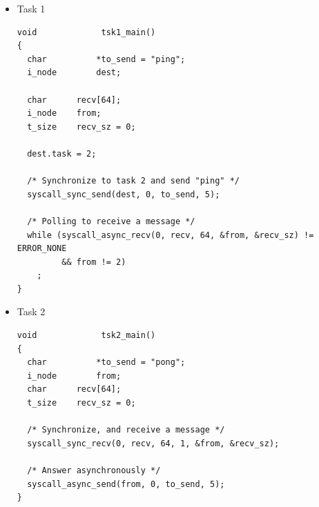 \begin{itemize}
  \item Task 1

\begin{verbatim}
void             tsk1_main()
{
  char          *to_send = "ping";
  i_node        dest;
  
  char		recv[64];
  i_node	from;
  t_size	recv_sz = 0;

  dest.task = 2;

  /* Synchronize to task 2 and send "ping" */
  syscall_sync_send(dest, 0, to_send, 5);

  /* Polling to receive a message */
  while (syscall_async_recv(0, recv, 64, &from, &recv_sz) != ERROR_NONE
         && from != 2)
    ;
}
\end{verbatim}

  \item Task 2

\begin{verbatim}
void             tsk2_main()
{
  char          *to_send = "pong";
  i_node        from;
  char		recv[64];
  t_size	recv_sz = 0;

  /* Synchronize, and receive a message */
  syscall_sync_recv(0, recv, 64, 1, &from, &recv_sz);

  /* Answer asynchronously */
  syscall_async_send(from, 0, to_send, 5);
}
\end{verbatim}

\end{itemize}
